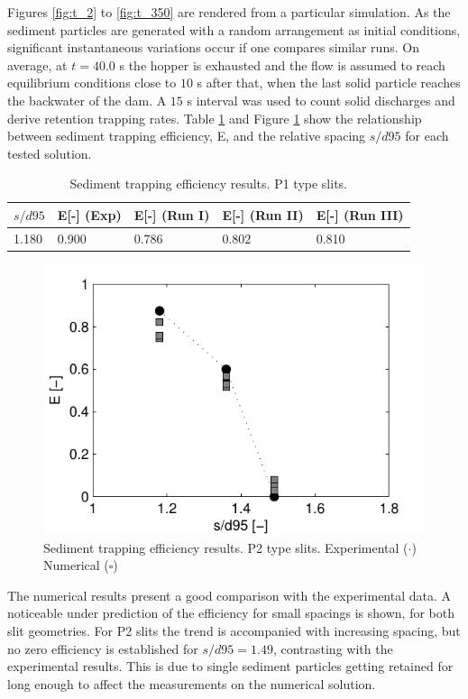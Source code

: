 Figures \ref{fig:t_2} to \ref{fig:t_350} are rendered from a particular simulation. As the sediment particles are generated with a random arrangement as initial conditions, significant instantaneous variations occur if one compares similar runs. On average, at $t=40.0$ s the hopper is exhausted and the flow is assumed to reach equilibrium conditions close to $10$ s after that, when the last solid particle reaches the backwater of the dam. A $15$ s interval was used to count solid discharges and derive retention trapping rates. Table \ref{tab:P1tr_comp} and Figure \ref{fig:P2tr_comp} show the relationship between sediment trapping efficiency, E, and the relative spacing $s/d95$ for each tested solution. 

\begin{table}[!ht]
\begin{center}
\begin{tabular}{l|llll} 
$s/d95$ & E[-] (Exp) & E[-] (Run I)& E[-] (Run II)& E[-] (Run III)\\
\hline
1.180 & 0.900 & 0.786 & 0.802 & 0.810 
\end{tabular}
\end{center}
\caption{Sediment trapping efficiency results. P1 type slits.}
\label{tab:P1tr_comp}
\end{table}

%
%

%
\begin{figure}[ht!]
	\centering
	\includegraphics[width=0.50\linewidth]{Figures/6.Chapter/P2tr}
	\caption{Sediment trapping efficiency results. P2 type slits. Experimental ($\cdot$) Numerical ($\square$)}
	\label{fig:P2tr_comp} 
\end{figure}
%

The numerical results present a good comparison with the experimental data. A noticeable under prediction of the efficiency for small spacings is shown, for both slit geometries. For P2 slits the trend is accompanied with increasing spacing, but no zero efficiency is established for $s/d95=1.49$, contrasting with the experimental results. This is due to single sediment particles getting retained for long enough to affect the measurements on the numerical solution.


